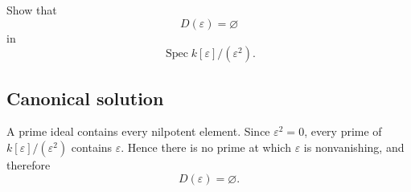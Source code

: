 
\begin{exercise}
	Show that
	\[
	D(\varepsilon)=\varnothing
	\]
	in
	\[
	\operatorname{Spec} k[\varepsilon]/(\varepsilon^2).
	\]
\end{exercise}

\subsection*{Canonical solution}
A prime ideal contains every nilpotent element. Since $\varepsilon^2=0$, every prime of $k[\varepsilon]/(\varepsilon^2)$ contains $\varepsilon$. Hence there is no prime at which $\varepsilon$ is nonvanishing, and therefore
\[
D(\varepsilon)=\varnothing.
\]
